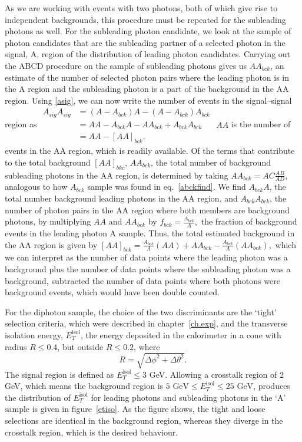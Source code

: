 As we are working with events with two photons, both of which give rise to independent backgrounds, this procedure must be repeated for the subleading photons as well. For the subleading photon candidate, we look at the sample of photon candidates that are the subleading partner of a selected photon in the signal, A, region of the distribution of leading photon candidates. Carrying out the ABCD procedure on the sample of subleading photons gives us $AA_{bck}$, an estimate of the number of selected photon pairs where the leading photon is in the A region and the subleading photon is a part of the background in the AA region.
Using \eqref{asig}, we can now write the number of events in the signal--signal region as
\(\begin{aligned}
A_{sig}A_{sig} &=(A-A_{bck})A-(A-A_{bck})A_{bck}\\ &=AA-A_{bck}A-AA_{bck}+A_{bck}A_{bck}\\&=AA-[AA]_{bck}.
\end{aligned}\)
$AA$ is the number of events in the AA region, which is readily available. Of the terms that contribute to the total background $[AA]_{bkc}$, $AA_{bck}$, the total number of background subleading photons in the AA region, is determined by taking
\(AA_{bck}=AC\frac{AB}{AD},\)
analogous to how $A_{bck}$ sample was found in eq.~\eqref{abckfind}. We find $A_{bck}A$, the total number background leading photons in the AA region, and $A_{bck}A_{bck}$, the number of photon pairs in the AA region where both members are background photons, by multiplying $AA$ and $AA_{bck}$ by
\(f_{bck}=\frac{A_{bck}}{A},\)
the fraction of background events in the leading photon A sample. Thus, the total estimated background in the AA region is given by
\([AA]_{bck}=\frac{A_{bck}}{A}(AA)+AA_{bck}-\frac{A_{bck}}{A}(AA_{bck}),\)
which we can interpret as the number of data points where the leading photon was a background plus the number of data points where the subleading photon was a background, subtracted the number of data points where both photons were background events, which would have been double counted.

For the diphoton sample, the choice of the two discriminants are the `tight' selection criteria, which were described in chapter~\ref{ch.exp}, and the transverse isolation energy, $E_T^{\text{isol}}$, the energy deposited in the calorimeter in a cone with radius $R\le0.4$, but outside $R\le0.2$, where
\[R=\sqrt{\Delta\phi^2+\Delta\theta^2}.\]
The signal region is defined as $E_T^{\text{isol}}\le3$ GeV. Allowing a crosstalk region of 2 GeV, which means the background region is $5\text{ GeV}\le E_T^{\text{isol}}\le25\text{ GeV}$, produces the distribution of $E_T^{\text{isol}}$ for leading photons and subleading photons in the `A' sample is given in figure~\ref{etiso}. As the figure shows, the tight and loose selections are identical in the background region, whereas they diverge in the crosstalk region, which is the desired behaviour.

